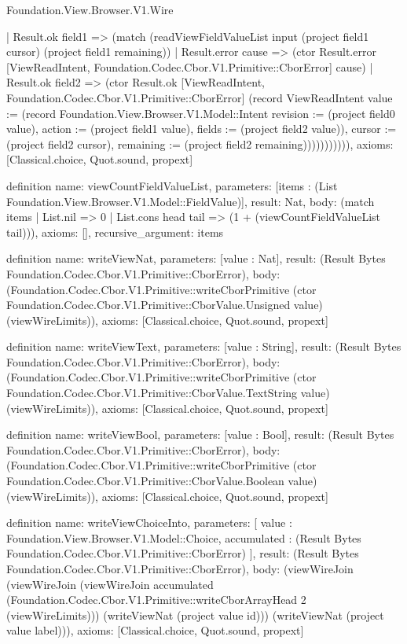 \begin{lexlean}{Foundation.View.Browser.V1.Wire}
\begin{semanticmodule}
{                | Result.ok field1 => (match (readViewFieldValueList input (project field1 cursor) (project field1 remaining))
                  | Result.error cause => (ctor Result.error [ViewReadIntent, Foundation.Codec.Cbor.V1.Primitive::CborError] cause)
                  | Result.ok field2 => (ctor Result.ok [ViewReadIntent, Foundation.Codec.Cbor.V1.Primitive::CborError] (record ViewReadIntent {value := (record Foundation.View.Browser.V1.Model::Intent {revision := (project field0 value), action := (project field1 value), fields := (project field2 value)}), cursor := (project field2 cursor), remaining := (project field2 remaining)})))))))))),
  axioms: [Classical.choice, Quot.sound, propext]
}

definition{
  name: viewCountFieldValueList,
  parameters: [items : (List Foundation.View.Browser.V1.Model::FieldValue)],
  result: Nat,
  body: (match items | List.nil => 0 | List.cons head tail => (1 + (viewCountFieldValueList tail))),
  axioms: [],
  recursive_argument: items
}

definition{
  name: writeViewNat,
  parameters: [value : Nat],
  result: (Result Bytes Foundation.Codec.Cbor.V1.Primitive::CborError),
  body: (Foundation.Codec.Cbor.V1.Primitive::writeCborPrimitive (ctor Foundation.Codec.Cbor.V1.Primitive::CborValue.Unsigned value) (viewWireLimits)),
  axioms: [Classical.choice, Quot.sound, propext]
}

definition{
  name: writeViewText,
  parameters: [value : String],
  result: (Result Bytes Foundation.Codec.Cbor.V1.Primitive::CborError),
  body: (Foundation.Codec.Cbor.V1.Primitive::writeCborPrimitive (ctor Foundation.Codec.Cbor.V1.Primitive::CborValue.TextString value) (viewWireLimits)),
  axioms: [Classical.choice, Quot.sound, propext]
}

definition{
  name: writeViewBool,
  parameters: [value : Bool],
  result: (Result Bytes Foundation.Codec.Cbor.V1.Primitive::CborError),
  body: (Foundation.Codec.Cbor.V1.Primitive::writeCborPrimitive (ctor Foundation.Codec.Cbor.V1.Primitive::CborValue.Boolean value) (viewWireLimits)),
  axioms: [Classical.choice, Quot.sound, propext]
}

definition{
  name: writeViewChoiceInto,
  parameters: [
    value : Foundation.View.Browser.V1.Model::Choice,
    accumulated : (Result Bytes Foundation.Codec.Cbor.V1.Primitive::CborError)
  ],
  result: (Result Bytes Foundation.Codec.Cbor.V1.Primitive::CborError),
  body: (viewWireJoin (viewWireJoin (viewWireJoin accumulated (Foundation.Codec.Cbor.V1.Primitive::writeCborArrayHead 2 (viewWireLimits))) (writeViewNat (project value id))) (writeViewNat (project value label))),
  axioms: [Classical.choice, Quot.sound, propext]
}


\end{semanticmodule}
\end{lexlean}
